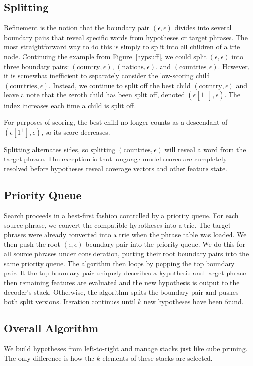 \documentclass[11pt]{article}
\begin{document}
\subsection{Splitting}
Refinement is the notion that the boundary pair $(\epsilon, \epsilon)$ divides into several boundary pairs that reveal specific words from hypotheses or target phrases.  The most straightforward way to do this is simply to split into all children of a trie node.  Continuing the example from Figure~\ref{hypsuff}, we could split $(\epsilon, \epsilon)$ into three boundary pairs: $(\text{country}, \epsilon)$, $(\text{nations}, \epsilon)$, and $(\text{countries}, \epsilon)$.  However, it is somewhat inefficient to separately consider the low-scoring child $(\text{countries}, \epsilon)$.  Instead, we continue to split off the best child $(\text{country}, \epsilon)$ and leave a note that the zeroth child has been split off, denoted $(\epsilon[1^+], \epsilon)$.  The index increases each time a child is split off.  

For purposes of scoring, the best child no longer counts as a descendant of $(\epsilon[1^+], \epsilon)$, so its score decreases.    

Splitting alternates sides, so splitting $(\text{countries}, \epsilon)$ will reveal a word from the target phrase.  The exception is that language model scores are completely resolved before hypotheses reveal coverage vectors and other feature state.  

\subsection{Priority Queue}
Search proceeds in a best-first fashion controlled by a priority queue.  For each source phrase, we convert the compatible hypotheses into a trie.  The target phrases were already converted into a trie when the phrase table was loaded.  We then push the root $(\epsilon, \epsilon)$ boundary pair into the priority queue.  We do this for all source phrases under consideration, putting their root boundary pairs into the same priority queue.  The algorithm then loops by popping the top boundary pair.  It the top boundary pair uniquely describes a hypothesis and target phrase then remaining features are evaluated and the new hypothesis is output to the decoder's stack.  Otherwise, the algorithm splits the boundary pair and pushes both split versions.  Iteration continues until $k$ new hypotheses have been found.  

\subsection{Overall Algorithm}
We build hypotheses from left-to-right and manage stacks just like cube pruning. The only difference is how the $k$ elements of these stacks are selected.  
\end{document}
